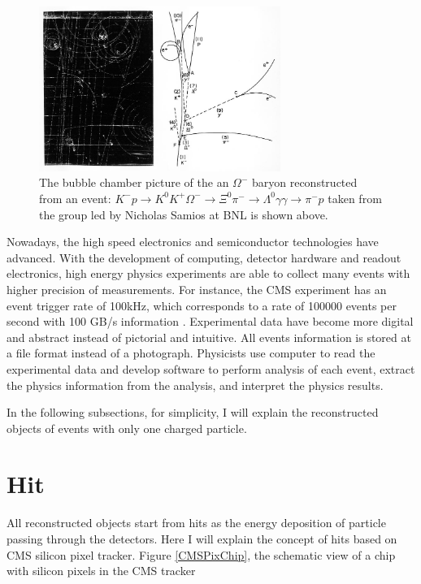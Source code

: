 \begin{figure}[hbtp]
\begin{center}
\includegraphics[width=0.70\textwidth]{Figures/Chapter3/Omega.jpg}
\caption{The bubble chamber picture of the an $\Omega^-$ baryon reconstructed from an event: $K^- p \rightarrow K^0 K^+ \Omega^- \rightarrow \Xi^0 \pi^- \rightarrow \Lambda^0 \gamma \gamma \rightarrow \pi^- p$ taken from the group led by Nicholas Samios at BNL is shown above.}
\label{OmegaNick}
\end{center}
\end{figure} 


Nowadays, the high speed electronics and semiconductor technologies have advanced. With the development of computing, detector hardware and readout electronics, high energy physics experiments are able to collect many events with higher precision of measurements. For instance, the CMS experiment has an event trigger rate of 100kHz, which corresponds to a rate of 100000 events per second with 100 GB/s information \cite{CMSDAQ}. Experimental data have become more digital and abstract instead of pictorial and intuitive. All events information is stored at a file format instead of a photograph. Physicists use computer to read the experimental data and develop software to perform analysis of each event, extract the physics information from the analysis, and interpret the physics results. 

In the following subsections, for simplicity, I will explain the reconstructed objects of events with only one charged particle. 

\section{Hit}

All reconstructed objects start from hits as the energy deposition of particle passing through the detectors. Here I will explain the concept of hits based on CMS silicon pixel tracker. Figure \ref{CMSPixChip}, the schematic view of a chip with silicon pixels in the CMS tracker


